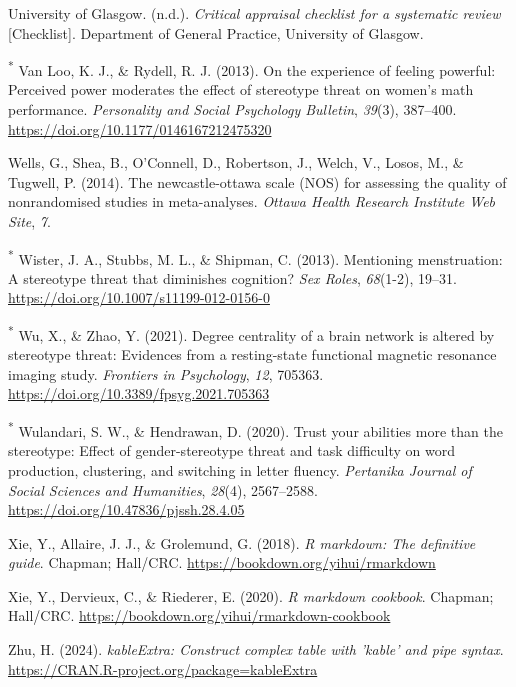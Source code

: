 \documentclass[
  stu, a4paper,floatsintext]{apa7}
\newlength{\cslhangindent}
\newenvironment{CSLReferences}[2] %
 {\begin{list}{}{%
  \setlength{\itemindent}{0pt}
  \setlength{\leftmargin}{0pt}
  \setlength{\parsep}{0pt}
  \ifodd #1
   \setlength{\leftmargin}{\cslhangindent}
   \setlength{\itemindent}{-1\cslhangindent}
  \fi
  \setlength{\itemsep}{#2\baselineskip}}}
 {\end{list}}
\begin{document}
\begin{CSLReferences}{1}{0}
University of Glasgow. (n.d.). \emph{Critical appraisal checklist for a systematic review} {[}Checklist{]}. Department of General Practice, University of Glasgow.

\textsuperscript{*} Van Loo, K. J., \& Rydell, R. J. (2013). On the experience of feeling powerful: {Perceived} power moderates the effect of stereotype threat on women's math performance. \emph{Personality and Social Psychology Bulletin}, \emph{39}(3), 387--400. \url{https://doi.org/10.1177/0146167212475320}

Wells, G., Shea, B., O'Connell, D., Robertson, J., Welch, V., Losos, M., \& Tugwell, P. (2014). The newcastle-ottawa scale ({NOS}) for assessing the quality of nonrandomised studies in meta-analyses. \emph{Ottawa Health Research Institute Web Site}, \emph{7}.

\textsuperscript{*} Wister, J. A., Stubbs, M. L., \& Shipman, C. (2013). Mentioning menstruation: A stereotype threat that diminishes cognition? \emph{Sex Roles}, \emph{68}(1-2), 19--31. \url{https://doi.org/10.1007/s11199-012-0156-0}

\textsuperscript{*} Wu, X., \& Zhao, Y. (2021). Degree centrality of a brain network is altered by stereotype threat: {Evidences} from a resting-state functional magnetic resonance imaging study. \emph{Frontiers in Psychology}, \emph{12}, 705363. \url{https://doi.org/10.3389/fpsyg.2021.705363}

\textsuperscript{*} Wulandari, S. W., \& Hendrawan, D. (2020). Trust your abilities more than the stereotype: {Effect} of gender-stereotype threat and task difficulty on word production, clustering, and switching in letter fluency. \emph{Pertanika Journal of Social Sciences and Humanities}, \emph{28}(4), 2567--2588. \url{https://doi.org/10.47836/pjssh.28.4.05}

Xie, Y., Allaire, J. J., \& Grolemund, G. (2018). \emph{R markdown: The definitive guide}. Chapman; Hall/CRC. \url{https://bookdown.org/yihui/rmarkdown}

Xie, Y., Dervieux, C., \& Riederer, E. (2020). \emph{R markdown cookbook}. Chapman; Hall/CRC. \url{https://bookdown.org/yihui/rmarkdown-cookbook}

Zhu, H. (2024). \emph{kableExtra: Construct complex table with 'kable' and pipe syntax}. \url{https://CRAN.R-project.org/package=kableExtra}

\end{CSLReferences}


\clearpage
\renewcommand{\listfigurename}{Figure captions}

\clearpage
\renewcommand{\listtablename}{Table captions}
\end{document}
